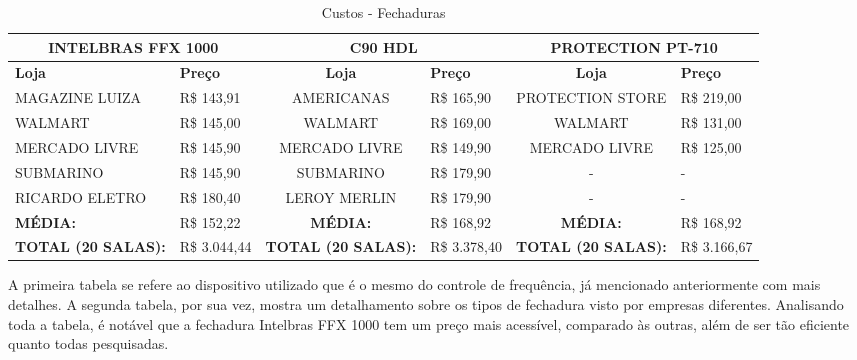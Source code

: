 \begin{table}[h]
  \centering
  \caption{Custos - Fechaduras}
  \label{my-label}
  \begin{tabular}{|l|l|c|l|c|l|}
    \hline
    \multicolumn{2}{|c|}{\parbox[t]{3cm}{\textbf{INTELBRAS FFX 1000}}} & \multicolumn{2}{c|}{\textbf{C90 HDL}}       & \multicolumn{2}{c|}{\parbox[t]{3cm}{\textbf{PROTECTION PT-710}}} \\ \hline
    \textbf{Loja}                 & \textbf{Preço}    & \textbf{Loja}              & \textbf{Preço} & \textbf{Loja}                & \textbf{Preço}   \\ \hline
    \parbox[t]{2cm}{MAGAZINE LUIZA}                & R\$ 143,91        & AMERICANAS                 & R\$ 165,90     & \parbox[t]{2cm}{PROTECTION STORE}             & R\$ 219,00       \\ \hline
    WALMART                       & R\$ 145,00        & WALMART                    & R\$ 169,00     & WALMART                      & R\$ 131,00       \\ \hline
    MERCADO LIVRE                 & R\$ 145,90        & \parbox[t]{2cm}{MERCADO LIVRE}              & R\$ 149,90     & \parbox[t]{2cm}{MERCADO LIVRE}                & R\$ 125,00       \\ \hline
    SUBMARINO                     & R\$ 145,90        & SUBMARINO                  & R\$ 179,90     & -                            & -                \\ \hline
    \parbox[t]{2cm}{RICARDO ELETRO}                 & R\$ 180,40        & \parbox[t]{2cm}{LEROY MERLIN}               & R\$ 179,90     & -                            & -                \\ \hline
    \textbf{MÉDIA:}               & R\$ 152,22        & \textbf{MÉDIA:}            & R\$ 168,92     & \textbf{MÉDIA:}              & R\$ 168,92       \\ \hline
    \parbox[t]{2cm}{\textbf{TOTAL (20 SALAS):}}    & R\$ 3.044,44      & \parbox[t]{2cm}{\textbf{TOTAL (20 SALAS):}} & R\$ 3.378,40   & \parbox[t]{2cm}{\textbf{TOTAL (20 SALAS):}}   & R\$ 3.166,67     \\ \hline
  \end{tabular}
\end{table}

A primeira tabela se refere ao dispositivo utilizado que é o mesmo do controle de frequência, já mencionado anteriormente com mais detalhes. A segunda tabela, por sua vez, mostra um detalhamento sobre os tipos de fechadura visto por empresas diferentes. Analisando toda a tabela, é notável que a fechadura Intelbras FFX 1000 tem um preço mais acessível, comparado às outras, além de ser tão eficiente quanto todas pesquisadas.

